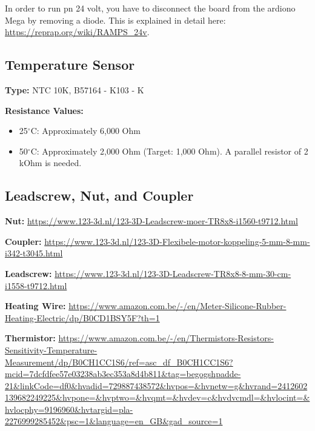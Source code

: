 In order to run pn 24 volt, you have to disconnect the board from the ardiono Mega by removing a diode.
This is explained in detail here: \url{https://reprap.org/wiki/RAMPS_24v}.

\subsection{Temperature Sensor}

\textbf{Type:} NTC 10K, B57164 - K103 - K

\textbf{Resistance Values:}
\begin{itemize}
    \item 25$^\circ$C: Approximately 6,000 Ohm
    \item 50$^\circ$C: Approximately 2,000 Ohm (Target: 1,000 Ohm).  A parallel resistor of 2 kOhm is needed.
\end{itemize}

\subsection{Leadscrew, Nut, and Coupler}

\textbf{Nut:} \url{https://www.123-3d.nl/123-3D-Leadscrew-moer-TR8x8-i1560-t9712.html}

\textbf{Coupler:} \url{https://www.123-3d.nl/123-3D-Flexibele-motor-koppeling-5-mm-8-mm-i342-t3045.html}

\textbf{Leadscrew:} \url{https://www.123-3d.nl/123-3D-Leadscrew-TR8x8-8-mm-30-cm-i1558-t9712.html}

\textbf{Heating Wire:} \url{https://www.amazon.com.be/-/en/Meter-Silicone-Rubber-Heating-Electric/dp/B0CD1BSY5F?th=1}

\textbf{Thermistor:} \url{https://www.amazon.com.be/-/en/Thermistors-Resistors-Sensitivity-Temperature-Measurement/dp/B0CH1CC1S6/ref=asc_df_B0CH1CC1S6?mcid=7dcfdfee57e03238ab3ec353a8d4b811&tag=begogshpadde-21&linkCode=df0&hvadid=729887438572&hvpos=&hvnetw=g&hvrand=2412602139682249225&hvpone=&hvptwo=&hvqmt=&hvdev=c&hvdvcmdl=&hvlocint=&hvlocphy=9196960&hvtargid=pla-2276999285452&psc=1&language=en_GB&gad_source=1}